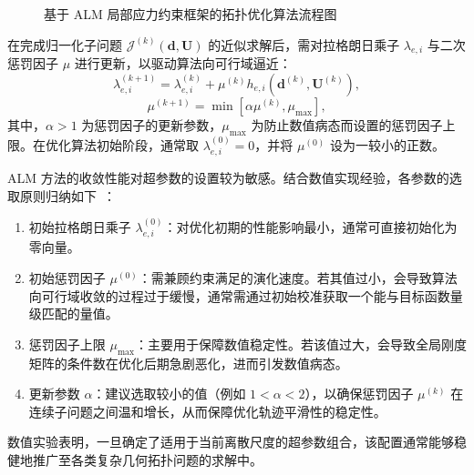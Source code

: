 \begin{figure}[H]
	
	\vspace{0.2cm}
	\caption{基于 ALM 局部应力约束框架的拓扑优化算法流程图}
	\label{fig:alm_flowchart}
\end{figure}

在完成归一化子问题 $\mathcal{J}^{(k)}(\boldsymbol{d}, \boldsymbol{U})$ 的近似求解后，需对拉格朗日乘子 $\lambda_{e,i}$ 与二次惩罚因子 $\mu$ 进行更新，以驱动算法向可行域逼近：
\begin{equation} \label{eq:ch4_multiplier_update}
	\lambda_{e,i}^{(k+1)} = \lambda_{e,i}^{(k)} + \mu^{(k)} h_{e,i}(\boldsymbol{d}^{(k)}, \boldsymbol{U}^{(k)}),
\end{equation}
\begin{equation} \label{eq:ch4_penalty_update}
	\mu^{(k+1)} = \min \left[ \alpha \mu^{(k)}, \mu_{\max} \right],
\end{equation}
其中，$\alpha > 1$ 为惩罚因子的更新参数，$\mu_{\max}$ 为防止数值病态而设置的惩罚因子上限。在优化算法初始阶段，通常取 $\lambda_{e,i}^{(0)} = 0$，并将 $\mu^{(0)}$ 设为一较小的正数。

ALM 方法的收敛性能对超参数的设置较为敏感。结合数值实现经验，各参数的选取原则归纳如下~\cite{giraldo-londonoPolyStressMatlabImplementation2021}：
\begin{enumerate}[
	label={（\arabic*）},
	labelsep=0.25em,
	leftmargin=3.2em,
	itemsep=0.4em,
	topsep=0.4em,
	parsep=0pt,
	partopsep=0pt
	]
	\item 初始拉格朗日乘子 $\lambda_{e,i}^{(0)}$：对优化初期的性能影响最小，通常可直接初始化为零向量。
	
	\item 初始惩罚因子 $\mu^{(0)}$：需兼顾约束满足的演化速度。若其值过小，会导致算法向可行域收敛的过程过于缓慢，通常需通过初始校准获取一个能与目标函数量级匹配的量值。
	
	\item 惩罚因子上限 $\mu_{\max}$：主要用于保障数值稳定性。若该值过大，会导致全局刚度矩阵的条件数在优化后期急剧恶化，进而引发数值病态。
	
	\item 更新参数 $\alpha$：建议选取较小的值（例如 $1 < \alpha < 2$），以确保惩罚因子 $\mu^{(k)}$ 在连续子问题之间温和增长，从而保障优化轨迹平滑性的稳定性。
\end{enumerate}
数值实验表明，一旦确定了适用于当前离散尺度的超参数组合，该配置通常能够稳健地推广至各类复杂几何拓扑问题的求解中。


